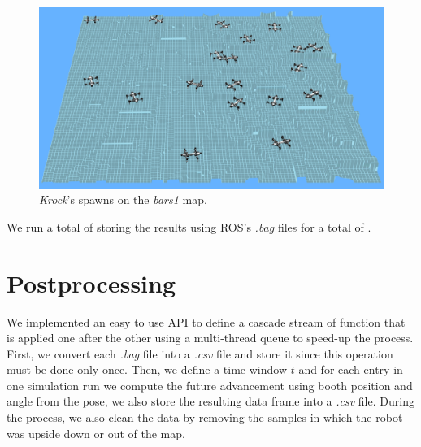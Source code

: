 \documentclass[../document.tex]{subfiles}
\begin{document}
\begin{figure}[H]
\centering
\includegraphics[width=\linewidth]{../img/krock-spawn-20-bars1.png}
\caption{\emph{Krock}'s spawns on the \emph{bars1} map.}
\end{figure}
We run a total of  storing the results using ROS's \emph{.bag} files for a total of .
\section{Postprocessing}

We implemented an easy to use API  to define a cascade stream of function that is applied one after the other using a multi-thread queue to speed-up the process.
First, we convert each \emph{.bag} file into a \emph{.csv} file and store it since this operation must be done only once. Then, we define a time window $t$ and for each entry in one simulation run we compute the future advancement using booth position and angle from the pose, we also store the resulting data frame into a \emph{.csv} file. During the process, we also clean the data by removing the samples in which the robot was upside down or out of the map.
\end{document}
